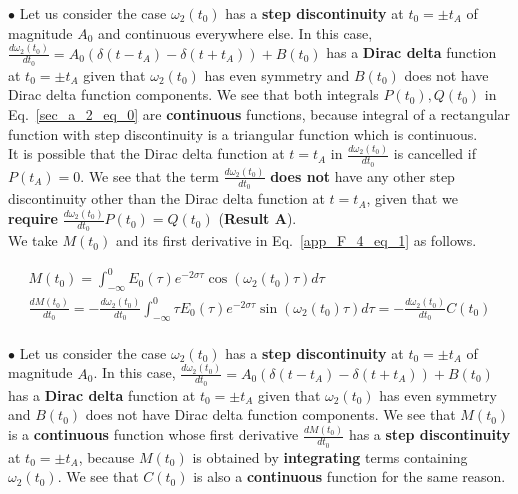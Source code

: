 \documentclass[11pt]{elsarticle}
\begin{document}
$\bullet$ Let us consider the case $\omega_2(t_0)$ has a \textbf{step discontinuity} at $t_0=\pm t_A$ of magnitude $A_0$ and continuous everywhere else. In this case, $\frac{d\omega_2(t_0)}{dt_0} = A_0 (\delta(t-t_A) - \delta(t+t_A) ) + B(t_0) $ has a\textbf{ Dirac delta} function at $t_0= \pm t_A$ given that $\omega_2(t_0)$ has even symmetry and $B(t_0)$ does not have Dirac delta function components. We see that both integrals $P(t_0), Q(t_0)$ in Eq.~\ref{sec_a_2_eq_0} are \textbf{continuous} functions, because integral of a rectangular function with step discontinuity is a triangular function which is continuous.\\

 It is possible that the Dirac delta function at $t=t_A$ in $\frac{d\omega_2(t_0)}{dt_0}$ is cancelled if $P(t_A)=0$. We see that the term $\frac{d\omega_2(t_0)}{dt_0}$ \textbf{does not} have any other step discontinuity other than the Dirac delta function at $t=t_A$, given that we \textbf{require} $\frac{d\omega_2(t_0)}{dt_0} P(t_0) =  Q(t_0)$ (\textbf{Result A}). \\

We take $M(t_0)$ and its first derivative in Eq.~\ref{app_F_4_eq_1}  as follows. 

\begin{eqnarray*}\label{sec_a_2_eq_1}   
M(t_0) =  \int_{-\infty}^{0}    E_0(\tau)e^{-2 \sigma \tau}  \cos{ (\omega_2(t_0) \tau)} d\tau \\
\frac{dM(t_0)}{dt_0} =  - \frac{d\omega_2(t_0)}{dt_0}  \int_{-\infty}^{0}  \tau  E_0(\tau)e^{-2 \sigma \tau}  \sin{ (\omega_2(t_0) \tau)} d\tau  =  - \frac{d\omega_2(t_0)}{dt_0} C(t_0) \\
\end{eqnarray*}
\begin{equation} \end{equation}




$\bullet$  Let us consider the case $\omega_2(t_0)$ has a \textbf{step discontinuity} at $t_0=\pm t_A$ of magnitude $A_0$. In this case, $\frac{d\omega_2(t_0)}{dt_0} = A_0 (\delta(t-t_A) - \delta(t+t_A) ) + B(t_0) $ has a\textbf{ Dirac delta} function at $t_0= \pm t_A$ given that $\omega_2(t_0)$ has even symmetry and $B(t_0)$ does not have Dirac delta function components. We see that $M(t_0)$ is a \textbf{continuous} function whose first derivative  $\frac{dM(t_0)}{dt_0}$ has a\textbf{ step discontinuity} at $t_0=\pm t_A$, because $M(t_0)$ is obtained by \textbf{integrating} terms containing $\omega_2(t_0)$. We see that $C(t_0)$ is also a  \textbf{continuous} function  for the same reason.\\
\end{document}
